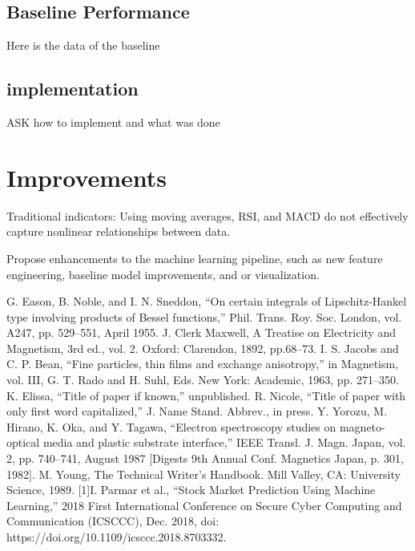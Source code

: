 \documentclass[conference]{IEEEtran}
\begin{document}
\subsection{Baseline Performance}
Here is the data of the baseline

\subsection{implementation}
ASK how to implement and what was done

\section{Improvements}
Traditional indicators: Using moving averages, RSI, and MACD do not effectively capture nonlinear relationships between data.

Propose enhancements to the machine learning pipeline, such as new feature engineering, baseline model improvements, and or visualization.



\begin{thebibliography}{00}
 G. Eason, B. Noble, and I. N. Sneddon, ``On certain integrals of Lipschitz-Hankel type involving products of Bessel functions,'' Phil. Trans. Roy. Soc. London, vol. A247, pp. 529--551, April 1955.
 J. Clerk Maxwell, A Treatise on Electricity and Magnetism, 3rd ed., vol. 2. Oxford: Clarendon, 1892, pp.68--73.
 I. S. Jacobs and C. P. Bean, ``Fine particles, thin films and exchange anisotropy,'' in Magnetism, vol. III, G. T. Rado and H. Suhl, Eds. New York: Academic, 1963, pp. 271--350.
 K. Elissa, ``Title of paper if known,'' unpublished.
 R. Nicole, ``Title of paper with only first word capitalized,'' J. Name Stand. Abbrev., in press.
 Y. Yorozu, M. Hirano, K. Oka, and Y. Tagawa, ``Electron spectroscopy studies on magneto-optical media and plastic substrate interface,'' IEEE Transl. J. Magn. Japan, vol. 2, pp. 740--741, August 1987 [Digests 9th Annual Conf. Magnetics Japan, p. 301, 1982].
 M. Young, The Technical Writer's Handbook. Mill Valley, CA: University Science, 1989.
[1]I. Parmar et al., “Stock Market Prediction Using Machine Learning,” 2018 First International Conference on Secure Cyber Computing and Communication (ICSCCC), Dec. 2018, doi: https://doi.org/10.1109/icsccc.2018.8703332.
‌
\end{thebibliography}
\vspace{12pt}
\end{document}
